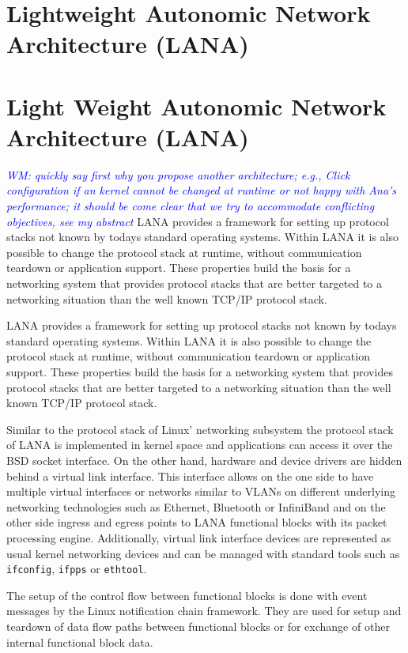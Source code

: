 \documentclass{sig-alternate}
\newcommand{\wolfgang}[1]{\textcolor{blue}{\emph{WM: #1}}}
\begin{document}
\section{Lightweight Autonomic Network Architecture (LANA)}

\section{Light Weight Autonomic Network Architecture (LANA)}

\wolfgang{quickly say first why you propose another architecture; e.g., Click configuration if an kernel cannot be changed at runtime or not happy with Ana's performance; it should be come clear that we try to accommodate conflicting objectives, see my abstract}
LANA provides a framework for setting up protocol stacks not known by todays standard operating systems. Within LANA it is also possible to change the protocol stack at runtime, without communication teardown or application support. These properties build the basis for a networking system that provides protocol stacks that are better targeted to a networking situation than the well known TCP/IP protocol stack.

LANA provides a framework for setting up protocol stacks not known by 
todays standard operating systems. Within LANA it is also possible to 
change the protocol stack at runtime, without communication teardown or 
application support. These properties build the basis for a networking 
system that provides protocol stacks that are better targeted to a 
networking situation than the well known TCP/IP protocol stack.
 
Similar to the protocol stack of Linux' networking subsystem the protocol 
stack of LANA is implemented in kernel space and applications can access 
it over the BSD socket interface. On the other hand, hardware and device drivers are 
hidden behind a virtual link interface. This interface allows on the 
one side to have multiple virtual interfaces or networks similar to 
VLANs on different underlying networking technologies such as Ethernet, 
Bluetooth or InfiniBand and on the other side ingress and egress points to 
LANA functional blocks with its packet processing engine. Additionally, 
virtual link interface devices are represented as usual kernel networking 
devices and can be managed with standard tools such as \texttt{ifconfig}, 
\texttt{ifpps} or \texttt{ethtool}.

The setup of the control flow between functional blocks is done with event
messages by the Linux notification chain framework. They are used for setup 
and teardown of data flow paths between functional blocks or for exchange of
other internal functional block data.
\end{document}
